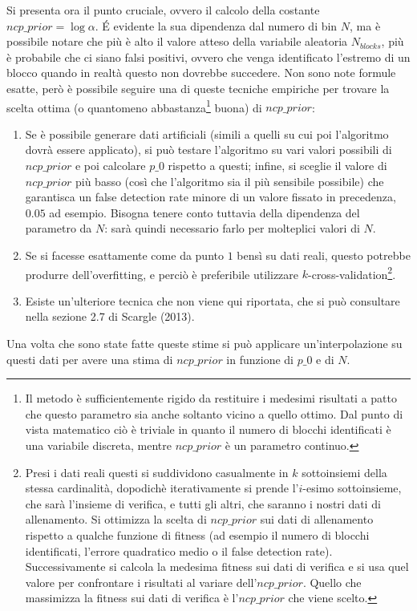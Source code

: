 \documentclass[10pt,a4paper]{report}
\begin{document}
Si presenta ora il punto cruciale, ovvero il calcolo della costante $ncp\_prior=\log\alpha$. \'E evidente la sua dipendenza dal numero di bin $N$, ma è possibile notare che più è alto il valore atteso della variabile aleatoria $N_{blocks}$, più è probabile che ci siano falsi positivi, ovvero che venga identificato l'estremo di un blocco quando in realtà questo non dovrebbe succedere. Non sono note formule esatte, però è possibile seguire una di queste tecniche empiriche per trovare la scelta ottima (o quantomeno abbastanza\footnote{Il metodo è sufficientemente rigido da restituire i medesimi risultati a patto che questo parametro sia anche soltanto vicino a quello ottimo. Dal punto di vista matematico ciò è triviale in quanto il numero di blocchi identificati è una variabile discreta, mentre $ncp\_prior$ è un parametro continuo.} buona) di $ncp\_prior$:
\begin{enumerate}
\item Se è possibile generare dati artificiali (simili a quelli su cui poi l'algoritmo dovrà essere applicato), si può testare l'algoritmo su vari valori possibili di $ncp\_prior$ e poi calcolare $p\_0$ rispetto a questi; infine, si sceglie il valore di $ncp\_prior$ più basso (così che l'algoritmo sia il più sensibile possibile) che garantisca un false detection rate minore di un valore fissato in precedenza, $0.05$ ad esempio. Bisogna tenere conto tuttavia della dipendenza del parametro da $N$: sarà quindi necessario farlo per molteplici valori di $N$.
\item Se si facesse esattamente come da punto $1$ bensì su dati reali, questo potrebbe produrre dell'overfitting, e perciò è preferibile utilizzare $k$-cross-validation\footnote{Presi i dati reali questi si suddividono casualmente in $k$ sottoinsiemi della stessa cardinalità, dopodichè iterativamente si prende l'$i$-esimo sottoinsieme, che sarà l'insieme di verifica, e tutti gli altri, che saranno i nostri dati di allenamento. Si ottimizza la scelta di $ncp\_prior$ sui dati di allenamento rispetto a qualche funzione di fitness (ad esempio il numero di blocchi identificati, l'errore quadratico medio o il false detection rate). Successivamente si calcola la medesima fitness sui dati di verifica e si usa quel valore per confrontare i risultati al variare dell'$ncp\_prior$. Quello che massimizza la fitness sui dati di verifica è l'$ncp\_prior$ che viene scelto.}.
\item Esiste un'ulteriore tecnica che non viene qui riportata, che si può consultare nella sezione 2.7 di Scargle (2013).
\end{enumerate}
Una volta che sono state fatte queste stime si può applicare un'interpolazione su questi dati per avere una stima di $ncp\_prior$ in funzione di $p\_0$ e di $N$.
\end{document}
